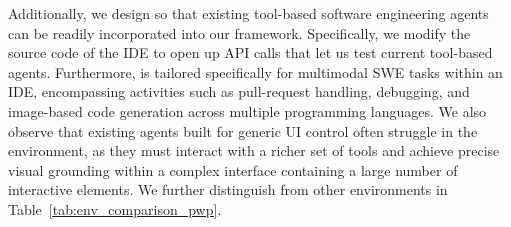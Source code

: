 Additionally, we design \ours{} so that existing tool-based software engineering agents can be readily incorporated into our framework. Specifically, we modify the source code of the IDE to open up API calls that let us test current tool-based agents. 
Furthermore, \bench{} is tailored specifically for multimodal SWE tasks within an IDE, encompassing activities such as pull-request handling, debugging, and image-based code generation across multiple programming languages. We also observe that existing agents built for generic UI control often struggle in the \ours{} environment, as they must interact with a richer set of tools and achieve precise visual grounding within a complex interface containing a large number of interactive elements. We further distinguish \ours{} from other environments in Table~\ref{tab:env_comparison_pwp}.
